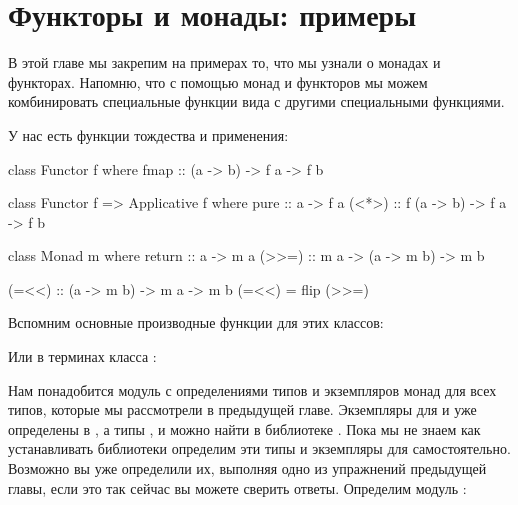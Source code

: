 \setcounter{chapter}{6}


\chapter{Функторы и монады: примеры}

В этой главе мы закрепим на примерах то, что мы 
узнали о монадах и функторах. Напомню, что 
с помощью монад и функторов мы можем комбинировать 
специальные функции вида 
с другими специальными функциями.

У нас есть функции тождества и применения:

\begin{code}
class Functor f where
    fmap :: (a -> b) -> f a -> f b

class Functor f => Applicative f where
    pure    :: a -> f a
    (<*>)   :: f (a -> b) -> f a -> f b

class Monad m where
    return  :: a -> m a
    (>>=)   :: m a -> (a -> m b) -> m b

(=<<) :: (a -> m b) -> m a -> m b
(=<<) = flip (>>=)
\end{code}

Вспомним основные производные функции для этих классов:

Или в терминах класса :


Нам понадобится модуль с определениями типов и 
экземпляров монад для всех типов, которые мы рассмотрели
в предыдущей главе. Экземпляры для \In{[]} и 
уже определены в , а типы , 
 и  можно найти в библиотеке
. Пока мы не знаем как устанавливать библиотеки
определим эти типы и экземпляры для  
самостоятельно. Возможно вы уже определили их, выполняя
одно из упражнений предыдущей главы, если это
так сейчас вы можете сверить ответы. Определим 
модуль :

